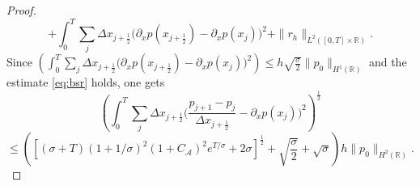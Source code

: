 \documentclass[a4paper,french,english,10pt]{article}
\newcommand\eps{\varepsilon}
\newcommand\V{\mathbf{V}}
\begin{document}
\begin{proof}
$$  $$
  $$
  +  \int_0^T \sum_j \Delta x_{j+\frac12 } \bigg( \partial_x p(x_{j+\frac12}) - \partial_x p(x_{j})  \bigg)^2
  +  \| r_h \|_{L^2([0,T]\times\mathbb{R})}  .
  $$
Since $\left( \int_0^T \sum_j \Delta x_{j+\frac12 } \big( \partial_x p(x_{j+\frac12}) - \partial_x p(x_{j})  \big)^2
\right)  \leq h\sqrt{ \frac{\sigma}{2}}\| p_0\|_{H^1(\mathbb{R})}$ and  the estimate \eqref{eq:bsr} holds, 
one gets
\begin{equation} \label{eq:mlpo}
\left( \int_0^T \sum_j \Delta x_{j+\frac12 } \bigg( \frac{p_{j+1}-p_{j}}{\Delta x_{j+\frac12 }} -\partial_x p(x_{j})  \bigg)^2 \right)^\frac12
\end{equation}
$$
  \leq  
   \left(
   \left[  (\sigma+T)
(1+1/\sigma) ^2\left(
 1
+ C_\mathcal A 
\right)^2
  e^{T/\sigma} +2\sigma \right] ^\frac12 +\sqrt{ \frac{\sigma}{2}}
  +\sqrt \sigma  \right)h  \| p_0 \| _{H^2(\mathbb{R})}.
  $$

\end{proof}
\end{document}
